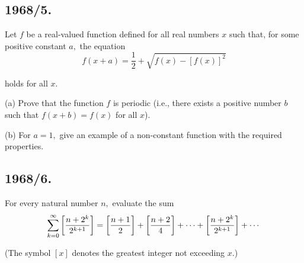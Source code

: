 \documentclass[12pt,thmsa]{article}
\begin{document}
\subsection{1968/5.}

Let $f$ be a real-valued function defined for all real numbers $x$ such
that, for some positive constant $a,$ the equation
\[
f(x+a)=\frac{1}{2}+\sqrt{f(x)-[f(x)]^{2}}
\]

holds for all $x.$

(a) Prove that the function $f$ is periodic (i.e., there exists a positive
number $b$ such that $f(x+b)=f(x)$ for all $x$).

(b) For $a=1,$ give an example of a non-constant function with the required
properties.

\subsection{1968/6.}

For every natural number $n,$ evaluate the sum
\[
\sum_{k=0}^{\infty }\left[ \frac{n+2^{k}}{2^{k+1}}\right] =\left[ \frac{n+1}{%
2}\right] +\left[ \frac{n+2}{4}\right] +\cdots +\left[ \frac{n+2^{k}}{2^{k+1}%
}\right] +\cdots 
\]

(The symbol $[x]$ denotes the greatest integer not exceeding $x.$)
\end{document}
